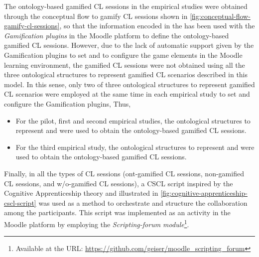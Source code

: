 The ontology-based gamified CL sessions in the empirical studies were obtained through the conceptual flow to gamify CL sessions shown in \autoref{fig:conceptual-flow-gamify-cl-sessions}, so that the information encoded in the  has been used with the \emph{Gamification plugins} in the Moodle platform to define the ontology-based gamified CL sessions. However, due to the lack of automatic support given by the Gamification plugins to set and to configure the game elements in the Moodle learning environment, the gamified CL sessions were not obtained using all the three ontological structures to represent gamified CL scenarios described in this model. In this sense, only two of three ontological structures to represent gamified CL scenarios were employed at the same time in each empirical study to set and configure the Gamification plugins, Thus,

\begin{itemize}
\item For the pilot, first and second empirical studies, the ontological structures to represent  and  were used to obtain the ontology-based gamified CL sessions.
\item For the third empirical study, the ontological structures to represent  and  were used to obtain the ontology-based gamified CL sessions.%
\end{itemize}

Finally, in all the types of CL sessions (ont-gamified CL sessions, non-gamified CL sessions, and w/o-gamified CL sessions), a CSCL script inspired by the Cognitive Apprenticeship theory and illustrated in \autoref{fig:cognitive-apprenticeship-cscl-script} was used as a method to orchestrate and structure the collaboration among the participants. This script was implemented as an activity in the Moodle platform by employing the \emph{Scripting-forum module}\footnote{Available at the URL: \url{https://github.com/geiser/moodle\_scripting\_forum}}.

